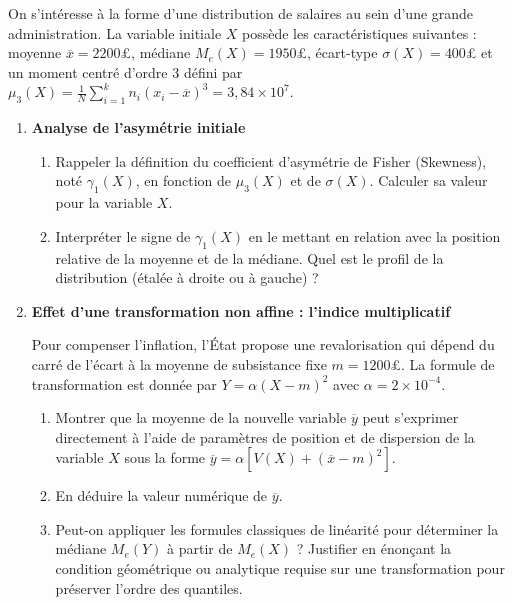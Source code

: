 \documentclass[11pt,a4paper]{article}
\begin{document}
On s'intéresse à la forme d'une distribution de salaires au sein d'une grande administration. La variable initiale $X$ possède les caractéristiques suivantes : moyenne $\overline{x} = 2200$£, médiane $M_e(X) = 1950$£{}, écart-type $\sigma(X) = 400$£{} et un moment centré d'ordre 3 défini par $\mu_3(X) = \frac{1}{N}\sum_{i=1}^k n_i(x_i - \overline{x})^3 = 3,84 \times 10^7$.

\begin{enumerate}
    \item \textbf{Analyse de l'asymétrie initiale}
    \begin{enumerate}
        \item Rappeler la définition du coefficient d'asymétrie de Fisher (Skewness), noté $\gamma_1(X)$, en fonction de $\mu_3(X)$ et de $\sigma(X)$. Calculer sa valeur pour la variable $X$.
        \item Interpréter le signe de $\gamma_1(X)$ en le mettant en relation avec la position relative de la moyenne et de la médiane. Quel est le profil de la distribution (étalée à droite ou à gauche) ?
    \end{enumerate}

    \item \textbf{Effet d'une transformation non affine : l'indice multiplicatif}
    
    Pour compenser l'inflation, l'État propose une revalorisation qui dépend du carré de l'écart à la moyenne de subsistance fixe $m = 1200$£. La formule de transformation est donnée par $Y = \alpha (X - m)^2$ avec $\alpha = 2 \times 10^{-4}$.
    \begin{enumerate}
        \item Montrer que la moyenne de la nouvelle variable $\overline{y}$ peut s'exprimer directement à l'aide de paramètres de position et de dispersion de la variable $X$ sous la forme $\overline{y} = \alpha \left[ V(X) + (\overline{x} - m)^2 \right]$.
        \item En déduire la valeur numérique de $\overline{y}$.
        \item Peut-on appliquer les formules classiques de linéarité pour déterminer la médiane $M_e(Y)$ à partir de $M_e(X)$ ? Justifier en énonçant la condition géométrique ou analytique requise sur une transformation pour préserver l'ordre des quantiles.
    \end{enumerate}
\end{enumerate}

\vspace{0.5cm}
\end{document}
